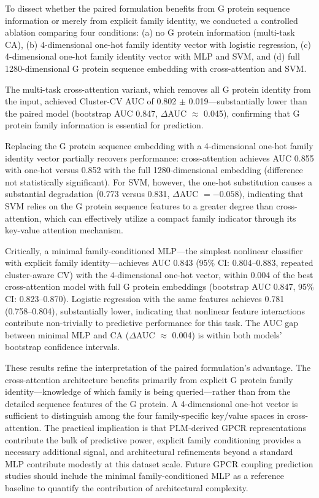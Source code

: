 \documentclass[11pt,a4paper]{article}
\begin{document}
To dissect whether the paired formulation benefits from G protein sequence information or merely from explicit family identity, we conducted a controlled ablation comparing four conditions: (a) no G protein information (multi-task CA), (b) 4-dimensional one-hot family identity vector with logistic regression, (c) 4-dimensional one-hot family identity vector with MLP and SVM, and (d) full 1280-dimensional G protein sequence embedding with cross-attention and SVM.

The multi-task cross-attention variant, which removes all G protein identity from the input, achieved Cluster-CV AUC of 0.802 $\pm$ 0.019---substantially lower than the paired model (bootstrap AUC 0.847, $\Delta$AUC $\approx$ 0.045), confirming that G protein family information is essential for prediction.

Replacing the G protein sequence embedding with a 4-dimensional one-hot family identity vector partially recovers performance: cross-attention achieves AUC 0.855 with one-hot versus 0.852 with the full 1280-dimensional embedding (difference not statistically significant). For SVM, however, the one-hot substitution causes a substantial degradation (0.773 versus 0.831, $\Delta$AUC $= -0.058$), indicating that SVM relies on the G protein sequence features to a greater degree than cross-attention, which can effectively utilize a compact family indicator through its key-value attention mechanism.

Critically, a minimal family-conditioned MLP---the simplest nonlinear classifier with explicit family identity---achieves AUC 0.843 (95\% CI: 0.804--0.883, repeated cluster-aware CV) with the 4-dimensional one-hot vector, within 0.004 of the best cross-attention model with full G protein embeddings (bootstrap AUC 0.847, 95\% CI: 0.823--0.870). Logistic regression with the same features achieves 0.781 (0.758--0.804), substantially lower, indicating that nonlinear feature interactions contribute non-trivially to predictive performance for this task. The AUC gap between minimal MLP and CA ($\Delta$AUC $\approx$ 0.004) is within both models' bootstrap confidence intervals.

These results refine the interpretation of the paired formulation's advantage. The cross-attention architecture benefits primarily from explicit G protein family identity---knowledge of which family is being queried---rather than from the detailed sequence features of the G protein. A 4-dimensional one-hot vector is sufficient to distinguish among the four family-specific key/value spaces in cross-attention. The practical implication is that PLM-derived GPCR representations contribute the bulk of predictive power, explicit family conditioning provides a necessary additional signal, and architectural refinements beyond a standard MLP contribute modestly at this dataset scale. Future GPCR coupling prediction studies should include the minimal family-conditioned MLP as a reference baseline to quantify the contribution of architectural complexity.
\end{document}
